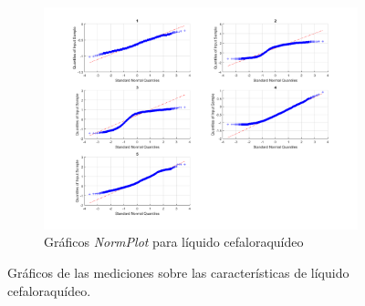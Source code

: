 \documentclass[11pt]{article} %
\begin{document}
\begin{figure}[h]
\begin{subfigure}[b]{0.475 \textwidth}
		\includegraphics[width = \textwidth]{./23/3_liquido/plotnorm.png}
		\caption{Gráficos \emph{NormPlot} para líquido cefaloraquídeo}
		\label{fig:23:liquid:normplot}
	\end{subfigure}
	\caption{Gráficos de las mediciones sobre las características de líquido cefaloraquídeo.}
	\label{fig:23:liquid}
\end{figure}
\end{document}
